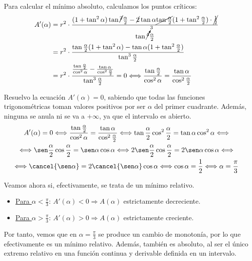 \begin{ejercicio}
    Para calcular el mínimo absoluto, calculamos los puntos críticos:
    \begin{equation*}\begin{split}
        A'(\alpha) &= r^2\cdot \frac{(1+\tan^2 \alpha)\tan\cancel{^2} \frac{\alpha}{2}-\cancel{2}\tan \alpha \cancel{\tan \frac{\alpha}{2}}(1+\tan^2 \frac{\alpha}{2})\cdot \cancel{\frac{1}{2}}}{\tan\cancelto{3}{^4} \frac{\alpha}{2}} \\
        &= r^2\cdot \frac{\tan \frac{\alpha}{2}(1+\tan^2\alpha)-\tan\alpha(1+ \tan^2 \frac{\alpha}{2})}{\tan^3 \frac{\alpha}{2}}\\
         &= r^2\cdot \frac{\frac{\tan \frac{\alpha}{2}}{\cos^2 \alpha} - \frac{\tan \alpha}{\cos^2 \frac{\alpha}{2}}}{\tan^3 \frac{\alpha}{2}} = 0 \Longleftrightarrow  \frac{\tan \frac{\alpha}{2}}{\cos^2 \alpha}=\frac{\tan \alpha}{\cos^2 \frac{\alpha}{2}}
    \end{split}\end{equation*}

    Resuelvo la ecuación $A'(\alpha)=0$, sabiendo que todas las funciones trigonométricas toman valores positivos por ser $\alpha$ del primer cuadrante. Además, ninguna se anula ni se va a $+\infty$, ya que el intervalo es abierto.
    \begin{multline*}
        A'(\alpha)=0 \Longleftrightarrow  \frac{\tan \frac{\alpha}{2}}{\cos^2 \alpha}=\frac{\tan \alpha}{\cos^2 \frac{\alpha}{2}}
        \Longleftrightarrow
        \tan \frac{\alpha}{2}\cos^2 \frac{\alpha}{2} = \tan \alpha \cos^2 \alpha
        \Longleftrightarrow \\ \Longleftrightarrow
        \sen \frac{\alpha}{2}\cos \frac{\alpha}{2} = \sen \alpha \cos \alpha
        \Longleftrightarrow
        2\sen \frac{\alpha}{2}\cos \frac{\alpha}{2} = 2\sen \alpha \cos \alpha
        \Longleftrightarrow \\ \Longleftrightarrow
        \cancel{\sen \alpha} = 2\cancel{\sen \alpha} \cos \alpha \Longleftrightarrow \cos{\alpha} = \frac{1}{2} \Longleftrightarrow \alpha=\frac{\pi}{3}
    \end{multline*}

    Veamos ahora si, efectivamente, se trata de un mínimo relativo.
    \begin{itemize}
        \item \underline{Para $\alpha<\frac{\pi}{3}$}: $A'(\alpha)<0 \Longrightarrow A(\alpha)$ estrictamente decreciente.
        \item \underline{Para $\alpha>\frac{\pi}{3}$}: $A'(\alpha)>0 \Longrightarrow A(\alpha)$ estrictamente creciente.
    \end{itemize}
    Por tanto, vemos que en $\alpha=\frac{\pi}{3}$ se produce un cambio de monotonía, por lo que efectivamente es un mínimo relativo. Además, también es absoluto, al ser el único extremo relativo en una función continua y derivable definida en un intervalo.


\end{ejercicio}
